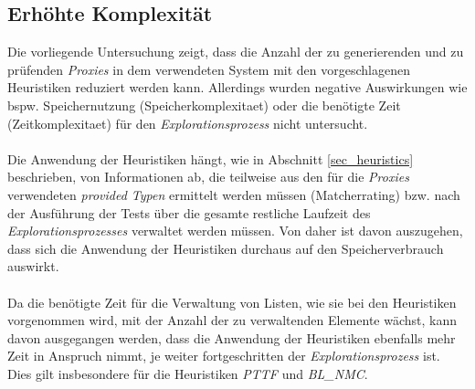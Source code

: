 \subsection{Erhöhte Komplexität}
Die vorliegende Untersuchung zeigt, dass die Anzahl der zu generierenden und zu prüfenden \emph{Proxies} in dem verwendeten System mit den vorgeschlagenen \Gls{Heuristik}en reduziert werden kann. Allerdings wurden negative Auswirkungen wie bspw. Speichernutzung (\Gls{Speicherkomplexitaet}) oder die benötigte Zeit (\Gls{Zeitkomplexitaet}) für den \emph{Explorationsprozess} nicht untersucht.
\\\\
Die Anwendung der \Gls{Heuristik}en hängt, wie in Abschnitt \ref{sec_heuristics} beschrieben, von Informationen ab, die teilweise aus den für die \emph{Proxies} verwendeten \emph{provided Typen} ermittelt werden müssen (Matcherrating) bzw. nach der Ausführung der Tests über die gesamte restliche Laufzeit des \emph{Explorationsprozesses} verwaltet werden müssen. Von daher ist davon auszugehen, dass sich die Anwendung der \Gls{Heuristik}en durchaus auf den Speicherverbrauch auswirkt.
\\\\
Da die benötigte Zeit für die Verwaltung von Listen, wie sie bei den \Gls{Heuristik}en vorgenommen wird, mit der Anzahl der zu verwaltenden Elemente wächst, kann davon ausgegangen werden, dass die Anwendung der \Gls{Heuristik}en ebenfalls mehr Zeit in Anspruch nimmt, je weiter fortgeschritten der \emph{Explorationsprozess} ist. Dies gilt insbesondere für die \Gls{Heuristik}en \emph{PTTF} und \emph{BL\_NMC}. 

